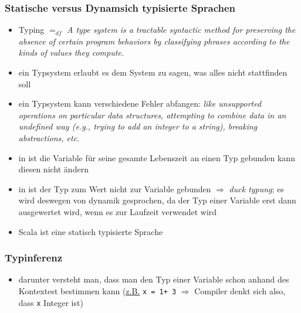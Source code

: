 \subsubsection{Statische versus Dynamsich typisierte Sprachen}
\begin{itemize}
  \item Typing $=_{df}$ \textit{A type system is a tractable syntactic method for preserving the absence of certain
program behaviors by classifying phrases according to the kinds of values they
compute.}

  \item ein Typsystem erlaubt es dem System zu sagen, was alles nicht
  stattfinden soll
  \item ein Typsystem kann verschiedene Fehler abfangen: \textit{like unsupported
operations on particular data structures, attempting to combine data in an undefined
way (e.g., trying to add an integer to a string), breaking abstractions, etc.
}
  \item in  ist die Variable für seine gesamte Lebenszeit an einen Typ gebunden \und kann diesen nicht ändern
  \item in  ist der Typ zum Wert \und 
  nicht zur Variable gebunden $\Rightarrow$ \textit{duck typung}; es wird
  deswegen von dynamik gesprochen, da der Typ einer Variable erst dann
  ausgewertet wird, wenn es zur Laufzeit verwendet wird
  \item Scala ist eine statisch typisierte Sprache
\end{itemize}


\subsubsection{Typinferenz}
\begin{itemize}
  \item darunter versteht man, dass man den Typ einer Variable schon anhand
  des Kontextest bestimmen kann (\uline{z.B.} \texttt{x = 1+ 3} $\Rightarrow$ 
  Compiler denkt sich also, dass \texttt{x} Integer ist)
\end{itemize}


